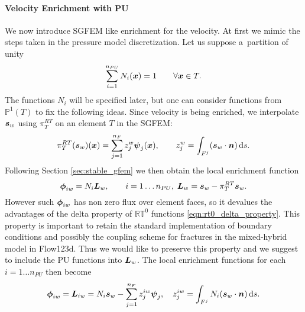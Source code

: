 \paragraph{Velocity Enrichment with PU}
We now introduce SGFEM like enrichment for the velocity.
At first we mimic the steps taken in the pressure model discretization.
Let us suppose a~partition of unity
\begin{equation}
    \sum\limits_{i=1}^{n_{PU}} N_i(\mathbf{\boldsymbol{x}}) = 1 \qquad \forall \mathbf{\boldsymbol{x}}\in T.
\end{equation}
The functions $N_i$ will be specified later, but one can consider functions from $\mathbb P^1(T)$ to fix the following ideas.
Since velocity is being enriched, we interpolate $\mathbf{\boldsymbol{s}}_w$ using $\pi^{RT}_T$ on an element $T$ in the SGFEM:
\begin{equation}
    \pi^{RT}_T(\mathbf{\boldsymbol{s}}_w)(\mathbf{\boldsymbol{x}}) = \sum \limits_{j=1}^{n_F} z^w_j \mathbf{\boldsymbol{\psi}}_j(\mathbf{\boldsymbol{x}}),
    \qquad z^w_j=\int_{F^j} (\mathbf{\boldsymbol{s}}_w\cdot \mathbf{\boldsymbol{n}})\,{\rm d} s \label{eqn:sgfem_interpolant_vel}.
\end{equation}
Following Section \ref{sec:stable_gfem} we then obtain the local enrichment function
\begin{equation}
    \mathbf{\boldsymbol{\phi}}_{iw}=N_i\mathbf{\boldsymbol{L}}_{w}, \qquad i=1\ldots n_{PU},\;\mathbf{\boldsymbol{L}}_{w}=\mathbf{\boldsymbol{s}}_w - \pi^{RT}_T\mathbf{\boldsymbol{s}}_w.
\end{equation}
However such $\mathbf{\boldsymbol{\phi}}_{iw}$ has non zero flux over element faces, so it devalues
the advantages of the delta property of $\mathbb{RT}^0$ functions \eqref{eqn:rt0_delta_property}.
This property is important to retain the standard implementation of boundary conditions
and possibly the coupling scheme for fractures in the mixed-hybrid model in Flow123d.
Thus we would like to preserve this property and we suggest to include the PU functions into $\mathbf{\boldsymbol{L}}_w$.
The local enrichment functions for each $i=1\ldots n_{PU}$ then become
\begin{equation}
    \mathbf{\boldsymbol{\phi}}_{iw} = \mathbf{\boldsymbol{L}}_{iw} = N_i\mathbf{\boldsymbol{s}}_w - \sum \limits_{j=1}^{n_F} z^{iw}_j \mathbf{\boldsymbol{\psi}}_j,
    \quad z^{iw}_j=\int_{F^j} N_i (\mathbf{\boldsymbol{s}}_w\cdot \mathbf{\boldsymbol{n}})\,{\rm d} s \label{eqn:local_enr_vel_PU}.
\end{equation}
